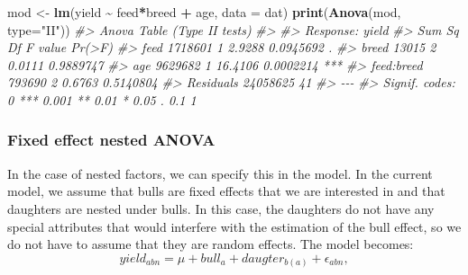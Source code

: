 \documentclass[
]{article}
\newenvironment{Shaded}{\begin{snugshade}}{\end{snugshade}}
\newcommand{\AttributeTok}[1]{\textcolor[rgb]{0.13,0.29,0.53}{#1}}
\newcommand{\CommentTok}[1]{\textcolor[rgb]{0.56,0.35,0.01}{\textit{#1}}}
\newcommand{\FunctionTok}[1]{\textcolor[rgb]{0.13,0.29,0.53}{\textbf{#1}}}
\newcommand{\NormalTok}[1]{#1}
\newcommand{\OtherTok}[1]{\textcolor[rgb]{0.56,0.35,0.01}{#1}}
\newcommand{\SpecialCharTok}[1]{\textcolor[rgb]{0.81,0.36,0.00}{\textbf{#1}}}
\newcommand{\StringTok}[1]{\textcolor[rgb]{0.31,0.60,0.02}{#1}}
\begin{document}
\begin{Shaded}
\begin{Highlighting}[]
\NormalTok{mod }\OtherTok{\textless{}{-}} \FunctionTok{lm}\NormalTok{(yield }\SpecialCharTok{\textasciitilde{}}\NormalTok{ feed}\SpecialCharTok{*}\NormalTok{breed }\SpecialCharTok{+}\NormalTok{ age, }\AttributeTok{data =}\NormalTok{ dat)}
\FunctionTok{print}\NormalTok{(}\FunctionTok{Anova}\NormalTok{(mod, }\AttributeTok{type=}\StringTok{"II"}\NormalTok{))}
\CommentTok{\#\textgreater{} Anova Table (Type II tests)}
\CommentTok{\#\textgreater{} }
\CommentTok{\#\textgreater{} Response: yield}
\CommentTok{\#\textgreater{}              Sum Sq Df F value    Pr(\textgreater{}F)    }
\CommentTok{\#\textgreater{} feed        1718601  1  2.9288 0.0945692 .  }
\CommentTok{\#\textgreater{} breed         13015  2  0.0111 0.9889747    }
\CommentTok{\#\textgreater{} age         9629682  1 16.4106 0.0002214 ***}
\CommentTok{\#\textgreater{} feed:breed   793690  2  0.6763 0.5140804    }
\CommentTok{\#\textgreater{} Residuals  24058625 41                      }
\CommentTok{\#\textgreater{} {-}{-}{-}}
\CommentTok{\#\textgreater{} Signif. codes:  0 \textquotesingle{}***\textquotesingle{} 0.001 \textquotesingle{}**\textquotesingle{} 0.01 \textquotesingle{}*\textquotesingle{} 0.05 \textquotesingle{}.\textquotesingle{} 0.1 \textquotesingle{} \textquotesingle{} 1}
\end{Highlighting}
\end{Shaded}

\subsubsection{Fixed effect nested
ANOVA}\label{fixed-effect-nested-anova}

In the case of nested factors, we can specify this in the model. In the
current model, we assume that bulls are fixed effects that we are
interested in and that daughters are nested under bulls. In this case,
the daughters do not have any special attributes that would interfere
with the estimation of the bull effect, so we do not have to assume that
they are random effects. The model becomes:
\[yield_{abn} = \mu + bull_a + daugter_{b(a)} + \epsilon_{abn},\]
\end{document}
